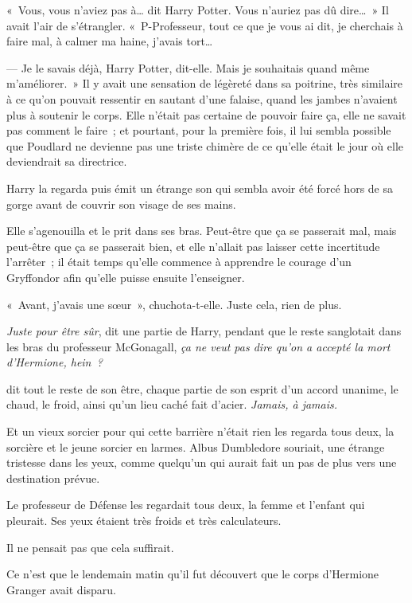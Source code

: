 «~Vous, vous n'aviez pas à… dit Harry Potter. Vous n'auriez pas dû dire…~» Il avait l'air de s'étrangler. «~P-Professeur, tout ce que je vous ai dit, je cherchais à faire mal, à calmer ma haine, j'avais tort…

--- Je le savais déjà, Harry Potter, dit-elle. Mais je souhaitais quand même m'améliorer.~» Il y avait une sensation de légèreté dans sa poitrine, très similaire à ce qu'on pouvait ressentir en sautant d'une falaise, quand les jambes n'avaient plus à soutenir le corps. Elle n'était pas certaine de pouvoir faire ça, elle ne savait pas comment le faire~; et pourtant, pour la première fois, il lui sembla possible que Poudlard ne devienne pas une triste chimère de ce qu'elle était le jour où elle deviendrait sa directrice.

Harry la regarda puis émit un étrange son qui sembla avoir été forcé hors de sa gorge avant de couvrir son visage de ses mains.

Elle s'agenouilla et le prit dans ses bras. Peut-être que ça se passerait mal, mais peut-être que ça se passerait bien, et elle n'allait pas laisser cette incertitude l'arrêter~; il était temps qu'elle commence à apprendre le courage d'un Gryffondor afin qu'elle puisse ensuite l'enseigner.

«~Avant, j'avais une sœur~», chuchota-t-elle. Juste cela, rien de plus.

\later

\emph{Juste pour être sûr}, dit une partie de Harry, pendant que le reste sanglotait dans les bras du professeur McGonagall, \emph{ça ne veut pas dire qu'on a accepté la mort d'Hermione, hein~?}

\emph{} dit tout le reste de son être, chaque partie de son esprit d'un accord unanime, le chaud, le froid, ainsi qu'un lieu caché fait d'acier. \emph{Jamais, à jamais.}

\later

Et un vieux sorcier pour qui cette barrière n'était rien les regarda tous deux, la sorcière et le jeune sorcier en larmes. Albus Dumbledore souriait, une étrange tristesse dans les yeux, comme quelqu'un qui aurait fait un pas de plus vers une destination prévue.

\later

Le professeur de Défense les regardait tous deux, la femme et l'enfant qui pleurait. Ses yeux étaient très froids et très calculateurs.

Il ne pensait pas que cela suffirait.

\later

Ce n'est que le lendemain matin qu'il fut découvert que le corps d'Hermione Granger avait disparu.
